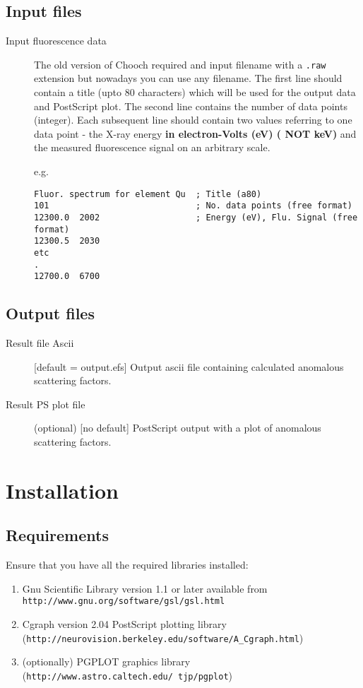 \documentclass[a4paper]{article}
\begin{document}
\subsection*{Input files}

\begin{description}
\item[Input fluorescence data] The old version of Chooch required and input
filename with a {\tt .raw} extension but nowadays you can use any filename.
The first line should contain a title (upto 80 characters) which will be
used for the output data and PostScript plot. The second line contains
the number of data points (integer). Each subsequent line should
contain two values referring to one data point - the X-ray energy {\bf
in electron-Volts (eV) ( NOT keV)} and the measured fluorescence
signal on an arbitrary scale.

e.g.
\begin{verbatim}
Fluor. spectrum for element Qu  ; Title (a80)
101                             ; No. data points (free format)
12300.0  2002                   ; Energy (eV), Flu. Signal (free format)
12300.5  2030
etc
.
12700.0  6700
\end{verbatim}
\end{description}

\subsection*{Output files}

\begin{description}
\item[Result file Ascii] [default = output.efs] Output ascii file containing calculated
anomalous scattering factors.
\item[Result PS plot file] (optional) [no default] PostScript output with a plot of
anomalous scattering factors.
\end{description}

\section*{Installation}

\subsection*{Requirements}

Ensure that you have all the required libraries installed:
\begin{enumerate}
\item Gnu Scientific Library version 1.1 or later available from
{\tt http://www.gnu.org/software/gsl/gsl.html}
\item Cgraph version 2.04 PostScript plotting library ({\tt http://neurovision.berkeley.edu/software/A\_Cgraph.html})
\item (optionally) PGPLOT graphics library 
({\tt http://www.astro.caltech.edu/~tjp/pgplot})
\end{enumerate}
\end{document}
